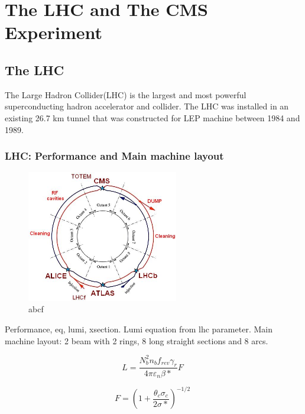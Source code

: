 \chapter{The LHC and The CMS Experiment}

\section{The LHC}
The Large Hadron Collider(LHC) is the largest and most powerful superconducting hadron accelerator and collider. The LHC was installed in an existing 26.7 km tunnel that was constructed for LEP machine between 1984 and 1989. 
\subsection{LHC: Performance and Main machine layout}

\begin{figure}[htbp]
 \begin{center}
  \includegraphics[width=0.59\textwidth]{figures/c3/c3_lhc_latticelayout.jpg}
 \end{center}
 \caption{abcf}
 \label{fig:c3lhclayout}
\end{figure}

Performance, eq, lumi, xsection. Lumi equation from lhc parameter.
Main machine layout: 2 beam with 2 rings, 8 long straight sections and 8 arcs.

\begin{equation}
 L = \frac{N^{2}_{b}n_{b}f_{rev}\gamma_{r}}{4\pi \varepsilon_{n}\beta *}F \;
 \label{eq:c3lhclumi}
\end{equation}

\begin{equation}
 F = (1+\frac{\theta_{c}\sigma_{c}}{2\sigma *})^{-1/2} \;
 \label{eq:c3lhcgeof}
\end{equation}

